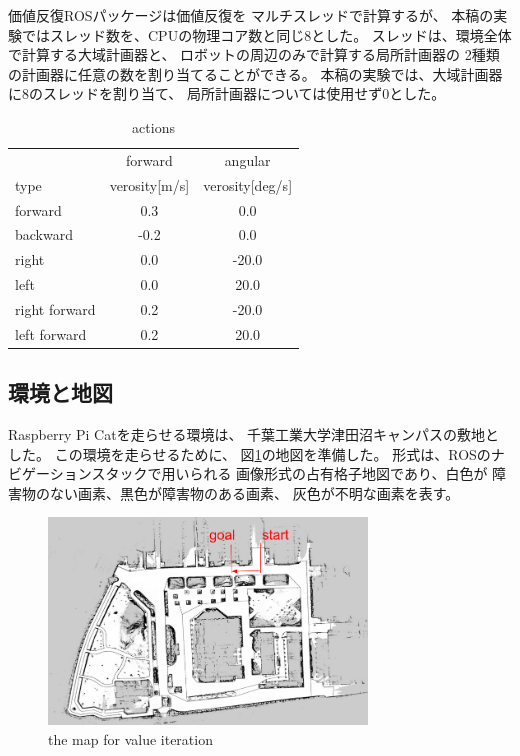 \documentclass{jarticle}
\begin{document}
価値反復ROSパッケージは価値反復を
マルチスレッドで計算するが、
本稿の実験ではスレッド数を、CPUの物理コア数と同じ$8$とした。
スレッドは、環境全体で計算する大域計画器と、
ロボットの周辺のみで計算する局所計画器の
2種類の計画器に任意の数を割り当てることができる。
本稿の実験では、大域計画器に$8$のスレッドを割り当て、
局所計画器については使用せず$0$とした。

\begin{table}[hbtp]
	\caption{actions}
	\label{table:actions}
	\centering
	\begin{small}
	\begin{tabular}{l|cc}
 		\hline
		& forward & angular \\
 		type & verosity[m/s] & verosity[deg/s] \\
 		\hline \hline
 		forward & 0.3 & 0.0 \\
 		backward & -0.2 & 0.0 \\
 		right & 0.0 & -20.0 \\
 		left & 0.0 & 20.0 \\
 		right forward & 0.2 & -20.0 \\
 		left forward & 0.2 & 20.0 \\
	 \hline
	\end{tabular}
	\end{small}
\end{table}


\subsection{環境と地図}

Raspberry Pi Catを走らせる環境は、
千葉工業大学津田沼キャンパスの敷地とした。
この環境を走らせるために、
図\ref{fig:tsudanuma}の地図を準備した。
形式は、ROSのナビゲーションスタックで用いられる
画像形式の占有格子地図であり、白色が
障害物のない画素、黒色が障害物のある画素、
灰色が不明な画素を表す。

\begin{figure}[bt]
  \centering
   \includegraphics[height=55mm]{./figs/tsudanuma.png}
   \caption{the map for value iteration}
	\label{fig:tsudanuma}
\end{figure}
\end{document}
